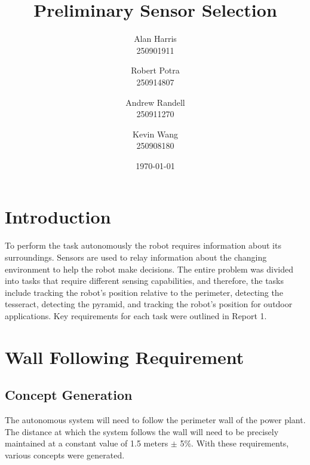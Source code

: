 \documentclass[12pt]{article}
\begin{document}
\title{\textbf{Preliminary Sensor Selection}}
\author{
  Alan Harris\\
  250901911
  \and
  Robert Potra\\
  250914807
  \and
  Andrew Randell\\
  250911270
  \and
  Kevin Wang\\
  250908180
}
\date{\today}
\maketitle

\setcounter{page}{1}

\section{Introduction}

To perform the task autonomously the robot requires information about its surroundings. Sensors are used to relay information about the changing environment to help the robot make decisions. The entire problem was divided into tasks that require different sensing capabilities, and therefore, the tasks include tracking the robot's position relative to the perimeter, detecting the tesseract, detecting the pyramid, and tracking the robot's position for outdoor applications. Key requirements for each task were outlined in Report 1.

\section{Wall Following Requirement}
\subsection{Concept Generation}

The autonomous system will need to follow the perimeter wall of the power plant. The distance at which the system follows the wall will need to be precisely maintained at a constant value of 1.5 meters $\pm$ 5\%. With these requirements, various concepts were generated.
\end{document}
